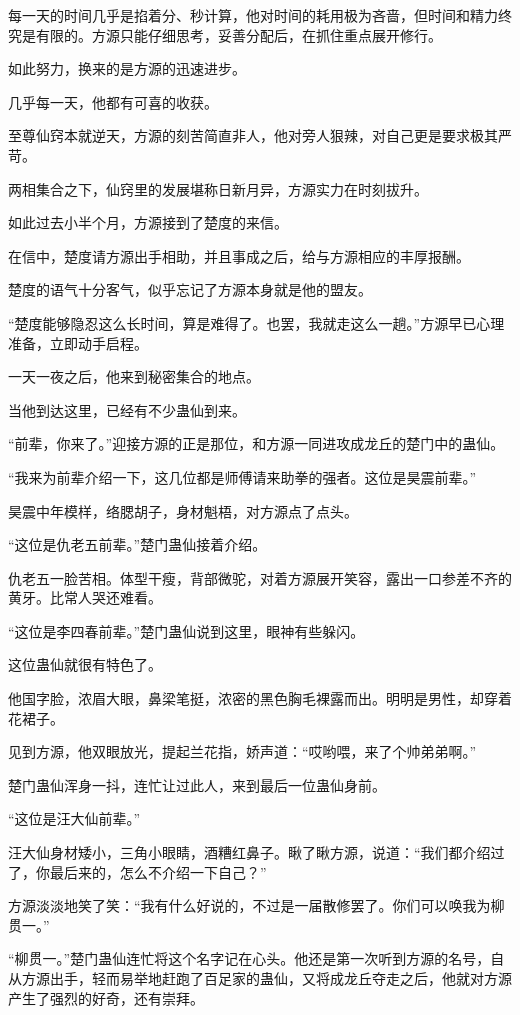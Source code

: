 \begin{this_body}
每一天的时间几乎是掐着分、秒计算，他对时间的耗用极为吝啬，但时间和精力终究是有限的。方源只能仔细思考，妥善分配后，在抓住重点展开修行。

如此努力，换来的是方源的迅速进步。

几乎每一天，他都有可喜的收获。

至尊仙窍本就逆天，方源的刻苦简直非人，他对旁人狠辣，对自己更是要求极其严苛。

两相集合之下，仙窍里的发展堪称日新月异，方源实力在时刻拔升。

如此过去小半个月，方源接到了楚度的来信。

在信中，楚度请方源出手相助，并且事成之后，给与方源相应的丰厚报酬。

楚度的语气十分客气，似乎忘记了方源本身就是他的盟友。

“楚度能够隐忍这么长时间，算是难得了。也罢，我就走这么一趟。”方源早已心理准备，立即动手启程。

一天一夜之后，他来到秘密集合的地点。

当他到达这里，已经有不少蛊仙到来。

“前辈，你来了。”迎接方源的正是那位，和方源一同进攻成龙丘的楚门中的蛊仙。

“我来为前辈介绍一下，这几位都是师傅请来助拳的强者。这位是昊震前辈。”

昊震中年模样，络腮胡子，身材魁梧，对方源点了点头。

“这位是仇老五前辈。”楚门蛊仙接着介绍。

仇老五一脸苦相。体型干瘦，背部微驼，对着方源展开笑容，露出一口参差不齐的黄牙。比常人哭还难看。

“这位是李四春前辈。”楚门蛊仙说到这里，眼神有些躲闪。

这位蛊仙就很有特色了。

他国字脸，浓眉大眼，鼻梁笔挺，浓密的黑色胸毛裸露而出。明明是男性，却穿着花裙子。

见到方源，他双眼放光，提起兰花指，娇声道：“哎哟喂，来了个帅弟弟啊。”

楚门蛊仙浑身一抖，连忙让过此人，来到最后一位蛊仙身前。

“这位是汪大仙前辈。”

汪大仙身材矮小，三角小眼睛，酒糟红鼻子。瞅了瞅方源，说道：“我们都介绍过了，你最后来的，怎么不介绍一下自己？”

方源淡淡地笑了笑：“我有什么好说的，不过是一届散修罢了。你们可以唤我为柳贯一。”

“柳贯一。”楚门蛊仙连忙将这个名字记在心头。他还是第一次听到方源的名号，自从方源出手，轻而易举地赶跑了百足家的蛊仙，又将成龙丘夺走之后，他就对方源产生了强烈的好奇，还有崇拜。


\end{this_body}
